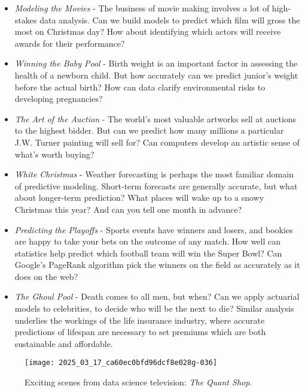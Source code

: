 \documentclass[10pt]{article}
\begin{document}

\begin{itemize}
    \item \textit{Modeling the Movies} - The business of movie making involves a lot of high-stakes data analysis. Can we build models to predict which film will gross the most on Christmas day? How about identifying which actors will receive awards for their performance?
    \item \textit{Winning the Baby Pool} - Birth weight is an important factor in assessing the health of a newborn child. But how accurately can we predict junior's weight before the actual birth? How can data clarify environmental risks to developing pregnancies?
    \item \textit{The Art of the Auction} - The world's most valuable artworks sell at auctions to the highest bidder. But can we predict how many millions a particular J.W. Turner painting will sell for? Can computers develop an artistic sense of what's worth buying?
    \item \textit{White Christmas} - Weather forecasting is perhaps the most familiar domain of predictive modeling. Short-term forecasts are generally accurate, but what about longer-term prediction? What places will wake up to a snowy Christmas this year? And can you tell one month in advance?
    \item \textit{Predicting the Playoffs} - Sports events have winners and losers, and bookies are happy to take your bets on the outcome of any match. How well can statistics help predict which football team will win the Super Bowl? Can Google's PageRank algorithm pick the winners on the field as accurately as it does on the web?
    \item \textit{The Ghoul Pool} - Death comes to all men, but when? Can we apply actuarial models to celebrities, to decide who will be the next to die? Similar analysis underlies the workings of the life insurance industry, where accurate predictions of lifespan are necessary to set premiums which are both sustainable and affordable.
\end{itemize}

\begin{figure}
    \centering
    \texttt{[image: 2025\_03\_17\_ca60ec0bfd96dcf8e028g-036]}
    \caption{Exciting scenes from data science television: \textit{The Quant Shop}.}
    \label{fig:quant_shop}
\end{figure}
\end{document}

